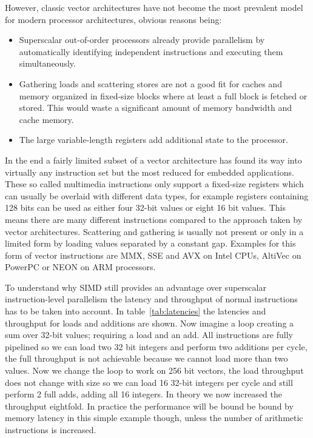 However, classic vector architectures have not become the most prevalent model
for modern processor architectures, obvious reasons being:
\begin{itemize}
\item Superscalar out-of-order processors already provide parallelism by
automatically identifying independent instructions and executing them
simultaneously.
\item Gathering loads and scattering stores are not a good fit for caches and
memory organized in fixed-size blocks where at least a full block is fetched or
stored. This would waste a significant amount of memory bandwidth and cache
memory.
\item The large variable-length registers add additional state to the processor.
\end{itemize}

In the end a fairly limited subset of a vector architecture has found its way
into virtually any instruction set but the most reduced for embedded
applications. These so called multimedia instructions only support a fixed-size
registers which can usually be overlaid with different data types, for example
registers containing 128 bits can be used as either four 32-bit values or eight
16 bit values. This means there are many different instructions compared to the
approach taken by vector architectures. Scattering and gathering is usually not
present or only in a limited form by loading values separated by a constant gap.
Examples for this form of vector instructions are MMX, SSE and AVX on Intel
CPUs, AltiVec on PowerPC or NEON on ARM processors.

To understand why SIMD still provides an advantage over superscalar
instruction-level parallelism the latency and throughput of normal instructions
has to be taken into account. In table~\ref{tab:latencies} the latencies and
throughput for loads and additions are shown. Now imagine a loop creating a sum
over 32-bit values; requiring a load and an add. All instructions are fully
pipelined so we can load two 32 bit integers and perform two additions per
cycle, the full throughput is not achievable because we cannot load more than
two values. Now we change the loop to work on 256 bit vectors, the load
throughput does not change with size so we can load 16 32-bit integers per cycle
and still perform 2 full adds, adding all 16 integers. In theory we now
increased the throughput eightfold. In practice the performance will be bound be
bound by memory latency in this simple example though, unless the number of
arithmetic instructions is increased.

